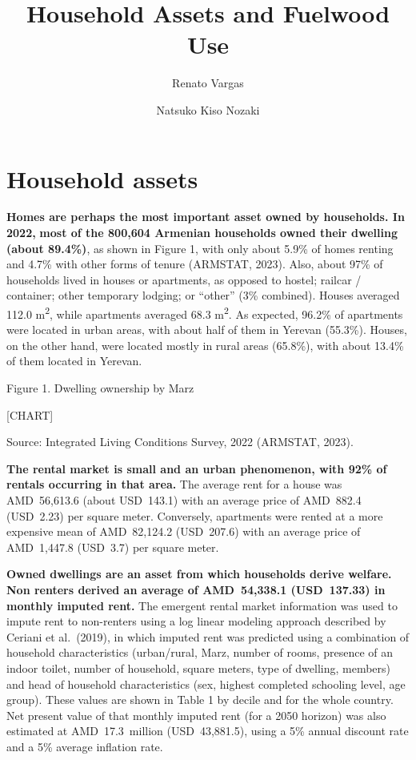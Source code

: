 \documentclass[
  letterpaper,
  DIV=11,
  numbers=noendperiod]{scrartcl}
\title{Household Assets and Fuelwood Use}
\author{Renato Vargas \and Natsuko Kiso Nozaki}
\date{}
\renewcommand*\contentsname{Table of contents}
\newcommand\contentsname{Table of contents}
\begin{document}
\maketitle

\renewcommand*\contentsname{Table of contents}
{
\hypersetup{linkcolor=}
\setcounter{tocdepth}{3}
\tableofcontents
}
\section{Household assets}\label{household-assets}

\textbf{Homes are perhaps the most important asset owned by households.
In 2022,} \textbf{most of the 800,604 Armenian households owned their
dwelling (about 89.4\%)}, as shown in Figure 1, with only about 5.9\% of
homes renting and 4.7\% with other forms of tenure (ARMSTAT, 2023).
Also, about 97\% of households lived in houses or apartments, as opposed
to hostel; railcar / container; other temporary lodging; or ``other''
(3\% combined). Houses averaged 112.0 m\textsuperscript{2}, while
apartments averaged 68.3 m\textsuperscript{2}. As expected, 96.2\% of
apartments were located in urban areas, with about half of them in
Yerevan (55.3\%). Houses, on the other hand, were located mostly in
rural areas (65.8\%), with about 13.4\% of them located in Yerevan.

\label{_Ref100306330}{}Figure 1. Dwelling ownership by
Marz

{{[}CHART{]}}

Source: Integrated Living Conditions Survey, 2022 (ARMSTAT, 2023).

\textbf{The rental market is small and an urban phenomenon, with 92\% of
rentals occurring in that area.} The average rent for a house was
AMD~56,613.6 (about USD~143.1) with an average price of AMD~882.4
(USD~2.23) per square meter. Conversely, apartments were rented at a
more expensive mean of AMD~82,124.2 (USD~207.6) with an average price of
AMD~1,447.8 (USD~3.7) per square meter.

\textbf{Owned dwellings are an asset from which households derive
welfare. Non renters derived an average of AMD~54,338.1 (USD~137.33) in
monthly imputed rent.} The emergent rental market information was used
to impute rent to non-renters using a log linear modeling approach
described by Ceriani et al.~(2019), in which imputed rent was predicted
using a combination of household characteristics (urban/rural, Marz,
number of rooms, presence of an indoor toilet, number of household,
square meters, type of dwelling, members) and head of household
characteristics (sex, highest completed schooling level, age group).
These values are shown in Table 1 by decile and for the whole country.
Net present value of that monthly imputed rent (for a 2050 horizon) was
also estimated at AMD~17.3~million (USD~43,881.5), using a 5\% annual
discount rate and a 5\% average inflation rate.
\end{document}

